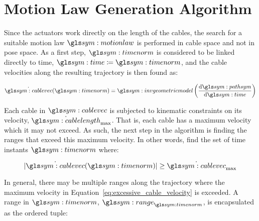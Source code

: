 \section{Motion Law Generation Algorithm}%
\label{sec:motion_law_generation_algorithm}

	Since the actuators work directly on the length of the cables, the
	search for a suitable motion law $\motionlaw$ is performed in cable
	space and not in pose space. As a first step, $\timenorm$ is considered
	to be linked directly to time, $\timesym \defeq \timenorm$, and the
	cable velocities along the resulting trajectory is then found as:

	\begin{equation}
		\dot{\cablevec}(\timenorm) =
			\invgeometricmodel
			\left(
				\frac
				{%
					\der\pathsym
				}
				{%
					\der\timesym
				}
			\right)
	\end{equation}

	Each cable in $\cablevec$ is subjected to kinematic constraints on its
	velocity, $\dot\cablelength_{\max}$.  That is, each cable has a maximum velocity which
	it may not exceed. As such, the next step in the algorithm is finding
	the ranges that exceed this maximum velocity. In other words, find the
	set of time instants $\timenorm$ where:

	\begin{equation}
		\abs{\dot{\cablevec}(\timenorm)} \geq \dot{\cablevec}_{\max}
		\label{eq:excessive_cable_velocity}
	\end{equation}

	In general, there may be multiple ranges along the trajectory where the
	maximum velocity in Equation~\ref{eq:excessive_cable_velocity} is
	exceeded. A range in $\timenorm$, $\rangetimenorm$, is encapsulated as
	the ordered tuple:





